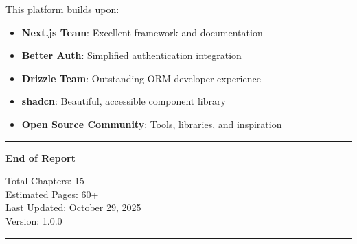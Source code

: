 \documentclass[12pt,a4paper]{report}
\begin{document}
This platform builds upon:
\begin{itemize}
    \item \textbf{Next.js Team}: Excellent framework and documentation
    \item \textbf{Better Auth}: Simplified authentication integration
    \item \textbf{Drizzle Team}: Outstanding ORM developer experience
    \item \textbf{shadcn}: Beautiful, accessible component library
    \item \textbf{Open Source Community}: Tools, libraries, and inspiration
\end{itemize}

\vfill

\begin{center}
\rule{0.3\textwidth}{0.4pt}

\textbf{End of Report}

Total Chapters: 15 \\
Estimated Pages: 60+ \\
Last Updated: October 29, 2025 \\
Version: 1.0.0

\rule{0.3\textwidth}{0.4pt}
\end{center}
\end{document}

